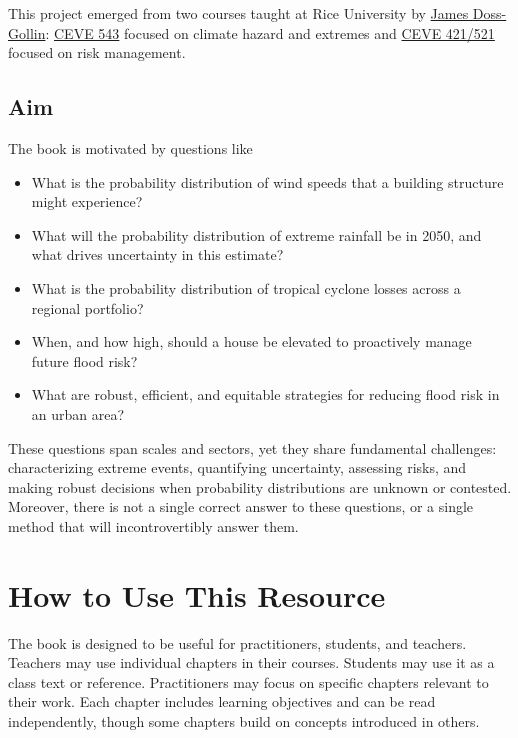 \documentclass[
  letterpaper,
  DIV=11,
  numbers=noendperiod]{scrreprt}
\providecommand{\tightlist}{%
  \setlength{\itemsep}{0pt}\setlength{\parskip}{0pt}}
\begin{document}
This project emerged from two courses taught at Rice University by
\href{https://dossgollin-lab.github.io}{James Doss-Gollin}:
\href{https://ceve543.github.io}{CEVE 543} focused on climate hazard and
extremes and \href{https://ceve-421-521.github.io}{CEVE 421/521} focused
on risk management.

\subsection*{Aim}\label{aim}

The book is motivated by questions like

\begin{itemize}
\tightlist
\item
  What is the probability distribution of wind speeds that a building
  structure might experience?
\item
  What will the probability distribution of extreme rainfall be in 2050,
  and what drives uncertainty in this estimate?
\item
  What is the probability distribution of tropical cyclone losses across
  a regional portfolio?
\item
  When, and how high, should a house be elevated to proactively manage
  future flood risk?
\item
  What are robust, efficient, and equitable strategies for reducing
  flood risk in an urban area?
\end{itemize}

These questions span scales and sectors, yet they share fundamental
challenges: characterizing extreme events, quantifying uncertainty,
assessing risks, and making robust decisions when probability
distributions are unknown or contested. Moreover, there is not a single
correct answer to these questions, or a single method that will
incontrovertibly answer them.

\section*{How to Use This Resource}\label{how-to-use-this-resource}


The book is designed to be useful for practitioners, students, and
teachers. Teachers may use individual chapters in their courses.
Students may use it as a class text or reference. Practitioners may
focus on specific chapters relevant to their work. Each chapter includes
learning objectives and can be read independently, though some chapters
build on concepts introduced in others.
\end{document}
